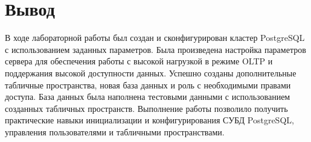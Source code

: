 \section{Вывод}

В ходе лабораторной работы был создан и сконфигурирован кластер PostgreSQL с использованием заданных параметров.
Была произведена настройка параметров сервера для обеспечения работы с высокой нагрузкой в режиме OLTP
и поддержания высокой доступности данных.
Успешно созданы дополнительные табличные пространства, новая база данных и роль с необходимыми правами доступа.
База данных была наполнена тестовыми данными с использованием созданных табличных пространств.
Выполнение работы позволило получить практические навыки инициализации и конфигурирования СУБД PostgreSQL,
управления пользователями и табличными пространствами.
